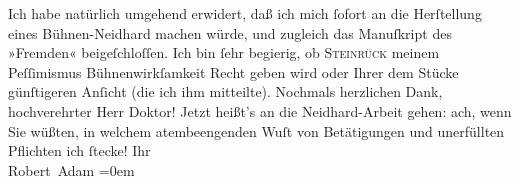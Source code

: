 \begin{ledgroupsized}[t]{13cm}
           \pstart
           Ich habe natürlich umgehend erwidert, daß ich mich ſofort an die Herſtellung eines
                  Bühnen-Neidhard machen würde, und zugleich
               das Manuſkript des »Fremden« beigeſchloſſen. Ich
               bin ſehr begierig, ob \textsc{Steinrück} meinem Peſſimismus \label{K_L02249_1v}\label{K_L02249_1h}
               Bühnenwirkſamkeit Recht geben wird oder Ihrer dem Stücke günſtigeren Anſicht (die ich
               ihm mitteilte).\pend
           \pstart
           Nochmals herzlichen Dank, hochverehrter Herr Doktor! Jetzt heißt’s an die Neidhard-Arbeit gehen: ach, wenn Sie wüßten, in
               welchem atembeengenden Wuſt von Be{\pb}tätigungen und
               unerfüllten Pflichten ich ſtecke!\pend
           \pstart
           Ihr{\\[\baselineskip]}\spacefill\mbox{Robert Adam}\pend
           \leftskip=0em{}
         
         \endnumbering{}\end{ledgroupsized}  \newcommand{\dateiname}{L02249}\newcommand{\titel}{Robert Adam an Arthur Schnitzler, 9. 12. 1916}\newcommand{\editorInnen}{Martin Anton Müller und Gerd-Hermann Susen}
      